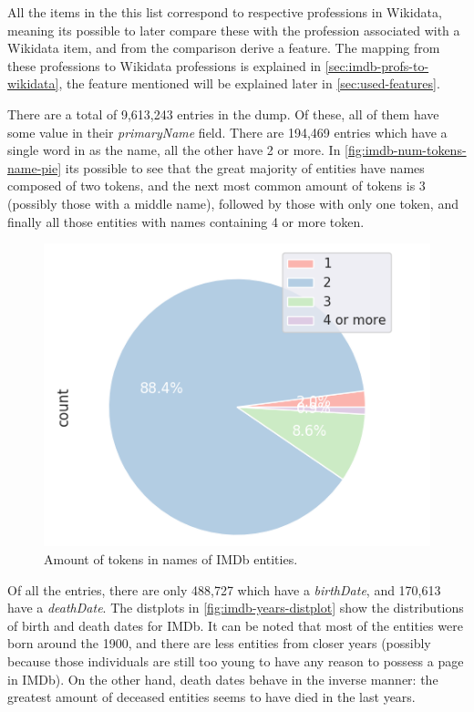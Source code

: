 \documentclass[epsfig,a4paper,11pt,titlepage,twoside,openany]{book}
\begin{document}
All the items in the this list correspond to respective professions in Wikidata, meaning its possible to later compare these with the profession associated with a Wikidata item, and from the comparison derive a feature. The mapping from these professions to Wikidata professions is explained in \autoref{sec:imdb-profs-to-wikidata}, the feature mentioned will be explained later in \autoref{sec:used-features}.

There are a total of 9,613,243 entries in the dump. Of these, all of them have some value in their \textit{primaryName} field. There are 194,469 entries which have a single word in as the name, all the other have 2 or more. In \autoref{fig:imdb-num-tokens-name-pie} its possible to see that the great majority of entities have names composed of two tokens, and the next most common amount of tokens is 3 (possibly those with a middle name), followed by those with only one token, and finally all those entities with names containing 4 or more token.

\begin{figure}[H]
  \centering \includegraphics[width=.6\textwidth]{imdb_num_tokens_names}
  \caption{Amount of tokens in names of IMDb entities.}
  \label{fig:imdb-num-tokens-name-pie}
\end{figure}


Of all the entries, there are only 488,727 which have a \textit{birthDate}, and 170,613 have a \textit{deathDate}. The distplots in \autoref{fig:imdb-years-distplot} show the distributions of birth and death dates for IMDb. It can be noted that most of the entities were born around the 1900, and there are less entities from closer years (possibly because those individuals are still too young to have any reason to possess a page in IMDb). On the other hand, death dates behave in the inverse manner: the greatest amount of deceased entities seems to have died in the last years.
\end{document}

